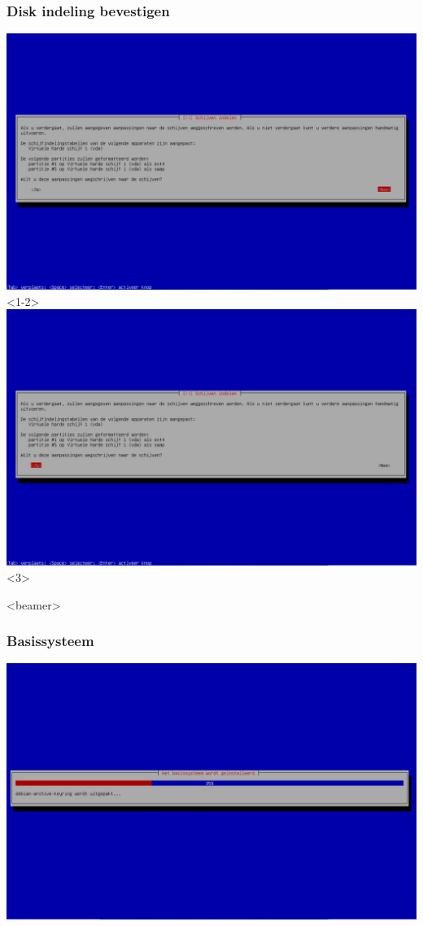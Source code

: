 \documentclass{beamer}
\begin{document}
\begin{frame}
   \frametitle{Disk indeling bevestigen}
   
   \centering
   \includegraphics[width=\textwidth]{img/indeling-bevestigen.png}<1-2>
   \includegraphics[width=\textwidth]{img/indeling-bevestigd.png}<3>
\end{frame}

\begin{frame}<beamer>
  \frametitle{Basissysteem}
   
   \centering
   \includegraphics[width=\textwidth]{img/basissysteem.png}
\end{frame}
\end{document}
